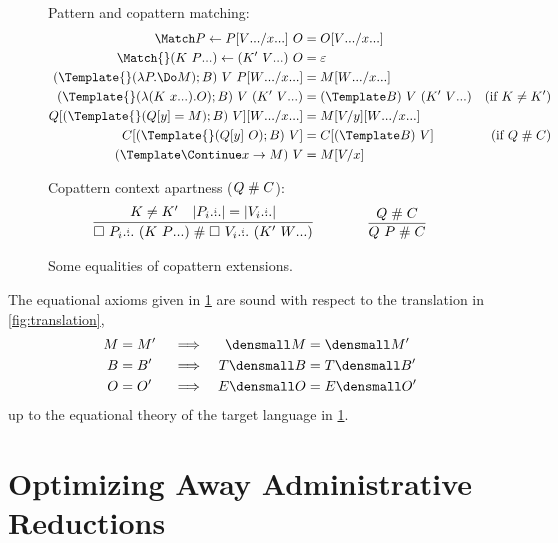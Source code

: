 \documentclass[runningheads]{llncs}
\begin{document}
\begin{figure}
Pattern and copattern matching:
\begin{align*}
  \Match P \gets P\subst{\many{x}}{\many{V}} ~ O
  &=
  O\subst{\many{x}}{\many{V}}
  \\
  \Match{} (K~\many{P}) \gets (K'~\many{V}) ~ O
  &=
  \varepsilon
  \\
  (\Template{} (\lambda P. \Do M); B) ~ V ~ P\subst{\many{x}}{\many{W}}
  &=
  M\subst{\many{x}}{\many{W}}
  \\
  (\Template{} (\lambda (K~\many{x}). O); B) ~ V ~ (K'~\many{V})
  &=
  (\Template B) ~ V ~ (K' ~ \many{V})
  &(\text{if } K \neq K')
  \\
  Q[(\Template{} (Q[y] = M); B) ~ V]\subst{\many{x}}{\many{W}}
  &=
  M\subst{y}{V}\subst{\many{x}}{\many{W}}
  \\
  C[(\Template{} (Q[y] ~ O); B) ~ V]
  &=
  C[(\Template B) ~ V]
  &(\text{if } Q \apart C)
  \\
  (\Template \Continue x \to M) ~ V
  &=
  M\subst{x}{V}
\end{align*}

Copattern context apartness ($Q \mathrel{\#} C$):
\begin{align*}
  \infer
  {\hole ~ \many[i]{P_i} ~ (K~\many{P}) \apart \hole ~ \many[i]{V_i} ~ (K'~\many{W})}
  {K \neq K' & |\many[i]{P_i}| = |\many[i]{V_i}|}
  \qqqquad
  \infer
  {Q ~ P \apart C}
  {Q \apart C}
\end{align*}

\caption{Some equalities of copattern extensions.}
\label{fig:source-equality}
\end{figure}

\begin{proposition}[Soundness]
  The equational axioms given in \cref{fig:source-equality} are sound with
  respect to the translation in \cref{fig:translation},
  \begin{align*}
    M &= M' &&\implies & \den{M} &= \den{M'} \\
    B &= B' &&\implies & T\den{B} &= T\den{B'} \\
    O &= O' &&\implies & E\den{O} &= E\den{O'}
  \end{align*}
  up to the equational theory of the target language in
  \cref{fig:source-equality}.
\end{proposition}

\section{Optimizing Away Administrative Reductions}
\end{document}
